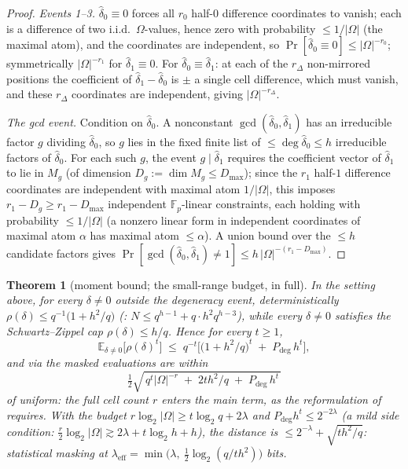 \documentclass{article}
\newcommand{\Fp}{\mathbb{F}_p}
\newtheorem{theorem}{Theorem}[section]
\theoremstyle{definition}
\begin{document}
\begin{proof}
\emph{Events 1--3.} $\hat\delta_0 \equiv 0$ forces all $r_0$ half-$0$ difference coordinates to vanish; each is a difference of two i.i.d.\ $\Omega$-values, hence zero with probability $\leq 1/|\Omega|$ (the maximal atom), and the coordinates are independent, so $\Pr[\hat\delta_0 \equiv 0] \leq |\Omega|^{-r_0}$; symmetrically $|\Omega|^{-r_1}$ for $\hat\delta_1 \equiv 0$. For $\hat\delta_0 \equiv \hat\delta_1$: at each of the $r_\Delta$ non-mirrored positions the coefficient of $\hat\delta_1 - \hat\delta_0$ is $\pm$ a single cell difference, which must vanish, and these $r_\Delta$ coordinates are independent, giving $|\Omega|^{-r_\Delta}$.

\emph{The gcd event.} Condition on $\hat\delta_0$. A nonconstant $\gcd(\hat\delta_0, \hat\delta_1)$ has an irreducible factor $g$ dividing $\hat\delta_0$, so $g$ lies in the fixed finite list of $\leq \deg \hat\delta_0 \leq h$ irreducible factors of $\hat\delta_0$. For each such $g$, the event $g \mid \hat\delta_1$ requires the coefficient vector of $\hat\delta_1$ to lie in $M_g$ (of dimension $D_g := \dim M_g \leq D_{\max}$); since the $r_1$ half-$1$ difference coordinates are independent with maximal atom $1/|\Omega|$, this imposes $r_1 - D_g \geq r_1 - D_{\max}$ independent $\Fp$-linear constraints, each holding with probability $\leq 1/|\Omega|$ (a nonzero linear form in independent coordinates of maximal atom $\alpha$ has maximal atom $\leq \alpha$). A union bound over the $\leq h$ candidate factors gives $\Pr[\gcd(\hat\delta_0, \hat\delta_1) \neq 1] \leq h\,|\Omega|^{-(r_1 - D_{\max})}$.
\end{proof}

\begin{theorem}[moment bound; the small-range budget, in full]\label{thm:moment}
In the setting above, for every $\delta \neq 0$ outside the degeneracy event, \emph{deterministically} $\rho(\delta) \leq q^{-1}\big(1 + h^2/q\big)$ (: $N \leq q^{h-1} + q \cdot h^2 q^{h-3}$), while every $\delta \neq 0$ satisfies the Schwartz--Zippel cap $\rho(\delta) \leq h/q$. Hence for every $t \geq 1$,
\[
\mathbb{E}_{\delta \neq 0}\big[\rho(\delta)^t\big] \;\leq\; q^{-t}\Big[\big(1 + h^2/q\big)^t \;+\; P_{\mathrm{deg}}\, h^t\Big] ,
\]
and via  the masked evaluations are within
\[
\tfrac12 \sqrt{\, q^t |\Omega|^{-r} \;+\; 2 t h^2/q \;+\; P_{\mathrm{deg}}\, h^t \,}
\]
of uniform: the \emph{full} cell count $r$ enters the main term, as the reformulation of  requires. With the budget $r \log_2 |\Omega| \geq t \log_2 q + 2\lambda$ and $P_{\mathrm{deg}} h^t \leq 2^{-2\lambda}$ (a mild side condition: $\tfrac{r}{2} \log_2|\Omega| \gtrsim 2\lambda + t \log_2 h + h$), the distance is $\leq 2^{-\lambda} + \sqrt{t h^2/q}$: statistical masking at $\lambda_{\mathrm{eff}} = \min\big(\lambda,\ \tfrac12 \log_2(q / t h^2)\big)$ bits.
\end{theorem}
\end{document}
